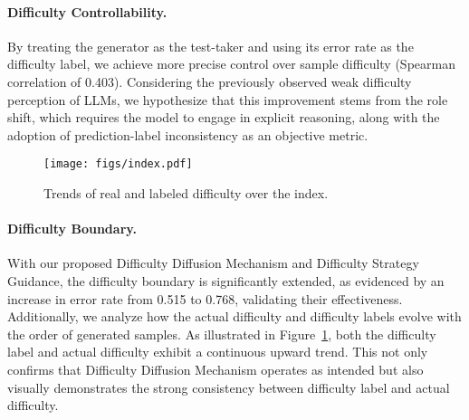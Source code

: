 \paragraph{Difficulty Controllability.}
By treating the generator as the test-taker and using its error rate as the difficulty label, we achieve more precise control over sample difficulty (Spearman correlation of 0.403). Considering the previously observed weak difficulty perception of LLMs, we hypothesize that this improvement stems from the role shift, which requires the model to engage in explicit reasoning, along with the adoption of prediction-label inconsistency as an objective metric.

\begin{figure}[t]
\centering
\texttt{[image: figs/index.pdf]}
\caption{Trends of real and labeled difficulty over the index.}
\label{fig:index}
\vspace{-5pt}
\end{figure}

\paragraph{Difficulty Boundary.}
With our proposed Difficulty Diffusion Mechanism and Difficulty Strategy Guidance, the difficulty boundary is significantly extended, as evidenced by an increase in error rate from 0.515 to 0.768, validating their effectiveness. Additionally, we analyze how the actual difficulty and difficulty labels evolve with the order of generated samples. As illustrated in Figure~\ref{fig:index}, both the difficulty label and actual difficulty exhibit a continuous upward trend. This not only confirms that Difficulty Diffusion Mechanism operates as intended but also visually demonstrates the strong consistency between difficulty label and actual difficulty.

